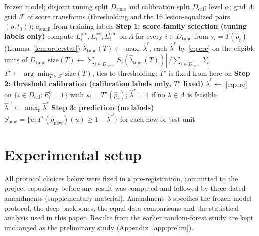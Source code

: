 \documentclass[sn-mathphys-num]{sn-jnl}%
\theoremstyle{thmstyleone}
\theoremstyle{thmstyletwo}
\theoremstyle{thmstylethree}
\newcommand{\1}{\mathbb{1}}
\newcommand{\lhat}{\hat\lambda}
\newcommand{\pix}{\mathrm{pix}}
\newcommand{\les}{\mathrm{les}}
\newcommand{\sml}{\mathrm{sml}}
\begin{document}
\begin{algorithm}[t]
\caption{Joint lesion-level CRC with a lesion-equalized family selected on the tuning split}\label{alg:joint}
\begin{algorithmic}[1]
\Require frozen model; disjoint tuning split $D_{\mathrm{tune}}$ and calibration split $D_{\mathrm{cal}}$; level $\alpha$; grid $\Lambda$; grid $\mathcal F$ of score transforms (thresholding and the 16 lesion-equalized pairs $(\rho,t_0)$); $a_{\mathrm{small}}$ from training labels
\Statex \textbf{Step 1: score-family selection (tuning labels only)}
  \State compute $L_i^{\pix},L_i^{\les},L_i^{\sml}$ on $\Lambda$ for every $i\in D_{\mathrm{tune}}$ from $s_i=T(\hat p_i)$ (Lemma~\ref{lem:orderstat})
  \State $\lhat_{\mathrm{tune}}(T)\gets\max_r\lhat^r$, each $\lhat^r$ by \eqref{eq:crc} on the eligible units of $D_{\mathrm{tune}}$
  \State $\mathrm{size}(T)\gets\sum_{i\in D_{\mathrm{tune}}}|S_i(\lhat_{\mathrm{tune}}(T))|\,/\sum_{i\in D_{\mathrm{tune}}}|Y_i|$
\EndFor
\State $T^\star\gets\arg\min_{T\in\mathcal F}\mathrm{size}(T)$, ties to thresholding; $T^\star$ is fixed from here on
\Statex \textbf{Step 2: threshold calibration (calibration labels only, $T^\star$ fixed)}
\For{$r\in\{\pix,\les,\sml\}$}
  \State $\lhat^r\gets$ \eqref{eq:crc} on $\{i\in D_{\mathrm{cal}}:E_i^r=1\}$ with $s_i=T^\star(\hat p_i)$; $\lhat^r=1$ if no $\lambda\in\Lambda$ is feasible
\EndFor
\State $\lhat^\cup\gets\max_r\lhat^r$
\Statex \textbf{Step 3: prediction (no labels)}
\State \Return $S_{\mathrm{new}}=\{u:T^\star(\hat p_{\mathrm{new}})(u)\ge1-\lhat^\cup\}$ for each new or test unit
\end{algorithmic}
\end{algorithm}

\section{Experimental setup}\label{sec:setup}

All protocol choices below were fixed in a pre-registration, committed to the project repository before any result was computed and followed by three dated amendments (supplementary material). Amendment~3 specifies the frozen-model protocol, the deep backbones, the equal-data comparisons and the statistical analysis used in this paper. Results from the earlier random-forest study are kept unchanged as the preliminary study (Appendix~\ref{app:prelim}).
\end{document}
